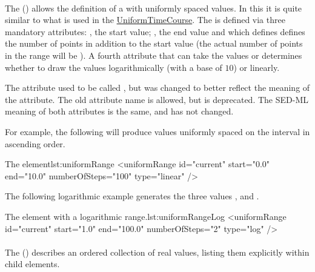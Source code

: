 
\paragraph{}
\label{class:uniformRange}
The  () allows the definition of a \Range with uniformly spaced values. In this it is quite similar to what is used in the \hyperref[class:uniformTimeCourse]{UniformTimeCourse}. The  is defined via three mandatory attributes: , the start value; , the end value and  which defines defines the number of points in addition to the start value (the actual number of points in the range will be ). A fourth attribute  that can take the values  or  determines whether to draw the values logarithmically (with a base of $10$) or linearly.

The  attribute used to be called , but was changed to better reflect the meaning of the attribute.  The old attribute name is allowed, but is deprecated.  The SED-ML meaning of both attributes is the same, and has not changed.

For example, the following  will produce  values uniformly spaced on the interval \code{$[0, 10]$} in ascending order.
\begin{myXmlLst}{The  element}{lst:uniformRange}
<uniformRange id="current" start="0.0" end="10.0" numberOfSteps="100" type="linear" /> 
\end{myXmlLst}

The following logarithmic example generates the three values ,  and .
\begin{myXmlLst}{The  element with a logarithmic range.}{lst:uniformRangeLog}
<uniformRange id="current" start="1.0" end="100.0" numberOfSteps="2" type="log" />
\end{myXmlLst}

\paragraph{}
\label{class:vectorRange}

The  () describes an ordered collection of real values, listing them explicitly within child \hyperref[class:value]{} elements.

